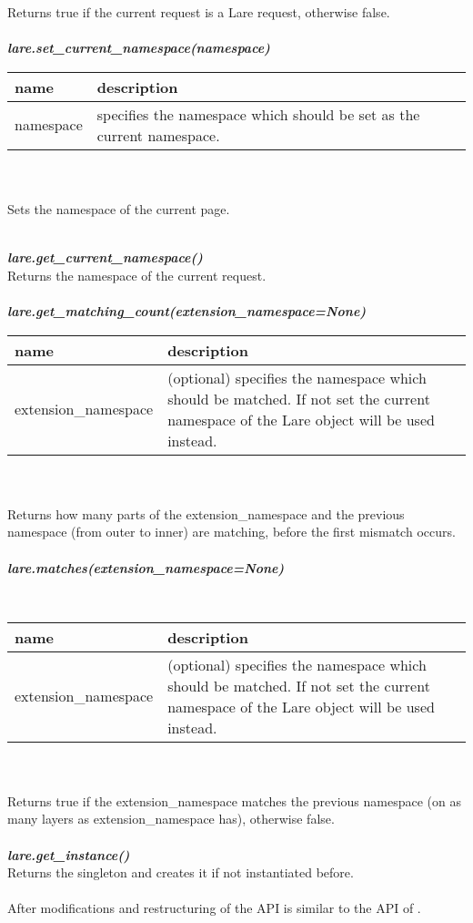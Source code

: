 Returns true if the current request is a Lare request, otherwise false.
\\
\\
\large{\textit{\textbf{lare.set\_current\_namespace(namespace)}}}
\\
\begin{tabular}{|p{4cm}|p{9.3cm}|}
    \hline
    \textbf{name} & \textbf{description} \\
    \hline
    namespace & specifies the namespace which should be set as the current namespace. \\
    \hline
\end{tabular}
\\
\\
Sets the namespace of the current page.
\\
\\
\large{\textbf{\textit{lare.get\_current\_namespace()}}
\\
Returns the namespace of the current request.
\\
\\
\large{\textbf{\textit{lare.get\_matching\_count(extension\_namespace=None)}}}
\\
\begin{tabular}{|p{4cm}|p{9.3cm}|}
    \hline
    \textbf{name} & \textbf{description} \\
    \hline
    extension\_namespace & (optional) specifies the namespace which should be matched. If not set the current namespace of the Lare object will be used instead. \\
    \hline
\end{tabular}
\\
\\
Returns how many parts of the extension\_namespace and the previous name\-space (from outer to inner) are matching, before the first mismatch occurs.
\\
\\
\large{\textbf{\textit{lare.matches(extension\_namespace=None)}}}}
\\
\begin{tabular}{|p{4.3cm}|p{9cm}|}
    \hline
    \textbf{name} & \textbf{description} \\
    \hline
    extension\_namespace & (optional) specifies the namespace which should be matched. If not set the current namespace of the Lare object will be used instead. \\
    \hline
\end{tabular}
\\
\\
Returns true if the extension\_namespace matches the previous namespace (on as many layers as extension\_namespace has), otherwise false.
\\
\\
\large{\textbf{\textit{lare.get\_instance()}}}
\\
Returns the \lare{} singleton and creates it if not instantiated before.
\\
\\
After modifications and restructuring of \djangoLare{} the API is similar to the API of \phpLare{}.


